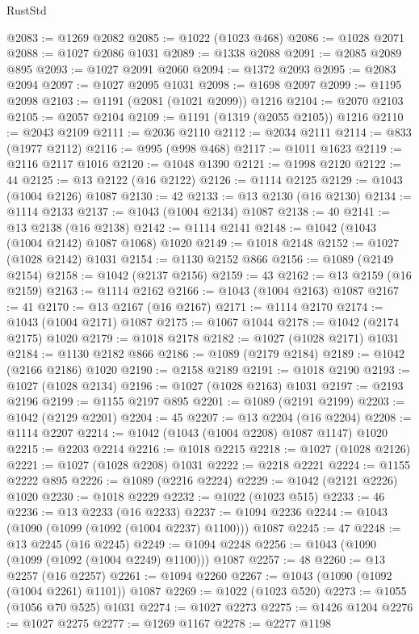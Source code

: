 \begin{lexlean}{RustStd}
\begin{coremodule}
{\begin{coremodule}
{{{{{{{{{{{{{{{{{{{{{{{{{{@2083 := @1269 @2082
@2085 := @1022 (@1023 @468)
@2086 := @1028 @2071
@2088 := @1027 @2086 @1031
@2089 := @1338 @2088
@2091 := @2085 @2089 @895
@2093 := @1027 @2091 @2060
@2094 := @1372 @2093
@2095 := @2083 @2094
@2097 := @1027 @2095 @1031
@2098 := @1698 @2097
@2099 := @1195 @2098
@2103 := @1191 (@2081 (@1021 @2099)) @1216
@2104 := @2070 @2103
@2105 := @2057 @2104
@2109 := @1191 (@1319 (@2055 @2105)) @1216
@2110 := @2043 @2109
@2111 := @2036 @2110
@2112 := @2034 @2111
@2114 := @833 (@1977 @2112)
@2116 := @995 (@998 @468)
@2117 := @1011 @1623
@2119 := @2116 @2117 @1016
@2120 := @1048 @1390
@2121 := @1998 @2120
@2122 := 44
@2125 := @13 @2122 (@16 @2122)
@2126 := @1114 @2125
@2129 := @1043 (@1004 @2126) @1087
@2130 := 42
@2133 := @13 @2130 (@16 @2130)
@2134 := @1114 @2133
@2137 := @1043 (@1004 @2134) @1087
@2138 := 40
@2141 := @13 @2138 (@16 @2138)
@2142 := @1114 @2141
@2148 := @1042 (@1043 (@1004 @2142) @1087 @1068) @1020
@2149 := @1018 @2148
@2152 := @1027 (@1028 @2142) @1031
@2154 := @1130 @2152 @866
@2156 := @1089 (@2149 @2154)
@2158 := @1042 (@2137 @2156)
@2159 := 43
@2162 := @13 @2159 (@16 @2159)
@2163 := @1114 @2162
@2166 := @1043 (@1004 @2163) @1087
@2167 := 41
@2170 := @13 @2167 (@16 @2167)
@2171 := @1114 @2170
@2174 := @1043 (@1004 @2171) @1087
@2175 := @1067 @1044
@2178 := @1042 (@2174 @2175) @1020
@2179 := @1018 @2178
@2182 := @1027 (@1028 @2171) @1031
@2184 := @1130 @2182 @866
@2186 := @1089 (@2179 @2184)
@2189 := @1042 (@2166 @2186) @1020
@2190 := @2158 @2189
@2191 := @1018 @2190
@2193 := @1027 (@1028 @2134)
@2196 := @1027 (@1028 @2163) @1031
@2197 := @2193 @2196
@2199 := @1155 @2197 @895
@2201 := @1089 (@2191 @2199)
@2203 := @1042 (@2129 @2201)
@2204 := 45
@2207 := @13 @2204 (@16 @2204)
@2208 := @1114 @2207
@2214 := @1042 (@1043 (@1004 @2208) @1087 @1147) @1020
@2215 := @2203 @2214
@2216 := @1018 @2215
@2218 := @1027 (@1028 @2126)
@2221 := @1027 (@1028 @2208) @1031
@2222 := @2218 @2221
@2224 := @1155 @2222 @895
@2226 := @1089 (@2216 @2224)
@2229 := @1042 (@2121 @2226) @1020
@2230 := @1018 @2229
@2232 := @1022 (@1023 @515)
@2233 := 46
@2236 := @13 @2233 (@16 @2233)
@2237 := @1094 @2236
@2244 := @1043 (@1090 (@1099 (@1092 (@1004 @2237) @1100))) @1087
@2245 := 47
@2248 := @13 @2245 (@16 @2245)
@2249 := @1094 @2248
@2256 := @1043 (@1090 (@1099 (@1092 (@1004 @2249) @1100))) @1087
@2257 := 48
@2260 := @13 @2257 (@16 @2257)
@2261 := @1094 @2260
@2267 := @1043 (@1090 (@1092 (@1004 @2261) @1101)) @1087
@2269 := @1022 (@1023 @520)
@2273 := @1055 (@1056 @70 @525) @1031
@2274 := @1027 @2273
@2275 := @1426 @1204
@2276 := @1027 @2275
@2277 := @1269 @1167
@2278 := @2277 @1198
}}}}}}}}}}}}}}}}}}}}}}}}}}
\end{coremodule}}
\end{coremodule}
\end{lexlean}
